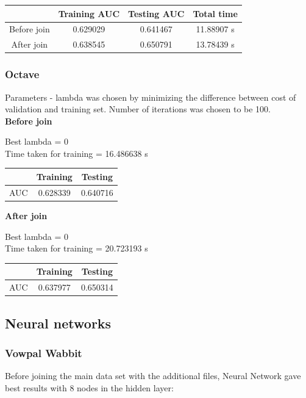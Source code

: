 \documentclass[10pt]{article}
\begin{document}
\begin{center}
 \begin{tabular}{|c | c | c | c||} 
 \hline
 & Training AUC & Testing AUC & Total time\\ [0.5ex]
 \hline\hline
Before join & 0.629029 & 0.641467 & 11.88907 s\\
 \hline
After join & 0.638545 & 0.650791 & 13.78439 s\\ 
 \hline
\end{tabular}
\end{center}

\subsubsection{Octave}
Parameters - lambda was chosen by minimizing the difference between cost of validation and training set. Number of iterations was chosen to be 100.
\\

\textbf{Before join}

	Best lambda = 0 
\\

	Time taken for training = 16.486638 s

\begin{center}
 \begin{tabular}{|c | c | c ||} 
 \hline
 & Training & Testing\\ [0.5ex] 
 \hline\hline
AUC & 0.628339 & 0.640716\\
 \hline
\end{tabular}
\end{center}

\textbf{After join}

	Best lambda = 0
\\
	Time taken for training = 20.723193 s
\\
\begin{center}
 \begin{tabular}{|c | c | c ||} 
 \hline
 & Training & Testing\\ [0.5ex] 
 \hline\hline
AUC & 0.637977 & 0.650314\\
 \hline
\end{tabular}
\end{center}


\subsection{Neural networks}
\subsubsection{Vowpal Wabbit}
Before joining the main data set with the additional files, Neural Network gave best results with 8 nodes in the hidden layer:\\
\end{document}
